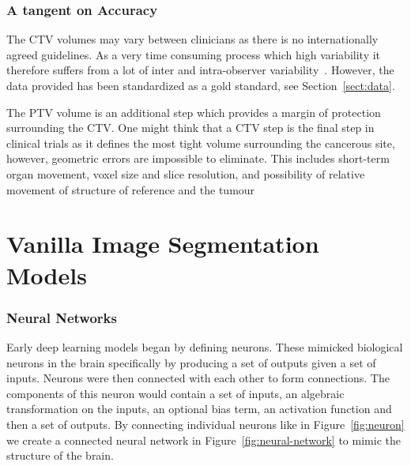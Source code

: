 \documentclass[11pt,twoside]{report}
\begin{document}
\subsubsection{A tangent on Accuracy}

The CTV volumes may vary between clinicians as there is no internationally agreed guidelines. As a very time consuming process which high variability it therefore suffers from a lot of inter and intra-observer variability~\cite{Lin2021-oz}. However, the data provided has been standardized as a gold standard, see Section~\ref{sect:data}.

The PTV volume is an additional step which provides a margin of protection surrounding the CTV. One might think that a CTV step is the final step in clinical trials as it defines the most tight volume surrounding the cancerous site, however, geometric errors are impossible to eliminate. This includes short-term organ movement, voxel size and slice resolution, and possibility of relative movement of structure of reference and the tumour~\cite{VANHERK200452}

\section{Vanilla Image Segmentation Models}\label{sect:vanilla-image-segmentation-models}

\subsubsection{Neural Networks}

Early deep learning models began by defining neurons. These mimicked biological neurons in the brain specifically by producing a set of outputs given a set of inputs. Neurons were then connected with each other to form connections. The components of this neuron would contain a set of inputs, an algebraic transformation on the inputs, an optional bias term, an activation function and then a set of outputs. By connecting individual neurons like in Figure~\ref{fig:neuron} we create a connected neural network in Figure~\ref{fig:neural-network} to mimic the structure of the brain.
\end{document}
